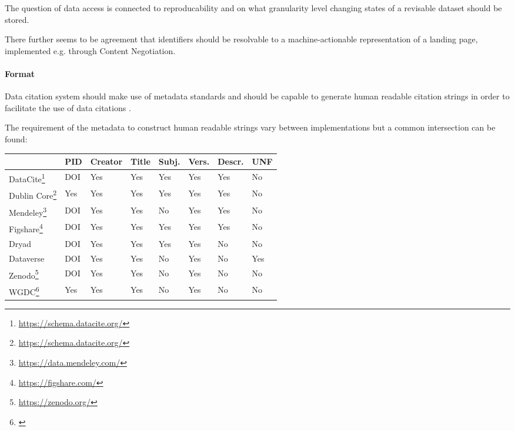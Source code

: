 \documentclass[a4paper,10pt]{article}
\begin{document}
The question of data access is connected to reproducability and on what granularity level changing states of a revisable dataset should be stored.


There further seems to be agreement that identifiers should be resolvable to a machine-actionable representation of a landing page, implemented e.g. through Content Negotiation.

\paragraph{Format}
Data citation system should make use of metadata standards \citep{CODATA2013} and should be capable to generate human readable citation strings in order to facilitate the use of data citations \citep{Buneman2016, Rauber2015}. 

The requirement of the metadata to construct human readable strings vary between implementations but a common intersection can be found:

\begin{tabularx}{\columnwidth}{lll lll ll}
\toprule
                                                          & PID   & Creator & Title & Subj.   & Vers.   & Descr.    & UNF \\ \midrule
DataCite\footnote{\url{https://schema.datacite.org/}}     & DOI   & Yes     & Yes   & Yes     & Yes     & Yes       & No  \\
Dublin Core\footnote{\url{https://schema.datacite.org/}}  & Yes   & Yes     & Yes   & Yes     & Yes     & Yes       & No  \\ 
Mendeley\footnote{\url{https://data.mendeley.com/}}       & DOI   & Yes     & Yes   & No      & Yes     & Yes       & No  \\
Figshare\footnote{\url{https://figshare.com/}}            & DOI   & Yes     & Yes   & Yes     & Yes     & Yes       & No  \\
Dryad                                                     & DOI   & Yes     & Yes   & Yes     & Yes     & No        & No  \\
Dataverse                                                 & DOI   & Yes     & Yes   & No      & Yes     & No        & Yes \\
Zenodo\footnote{\url{https://zenodo.org/}}                & DOI   & Yes     & Yes   & No      & Yes     & No        & No  \\
WGDC\footnote{\citep{Rauber2015}}                         & Yes   & Yes     & Yes   & No      & Yes     & No        & No  \\
\bottomrule
\end{tabularx}
\end{document}
